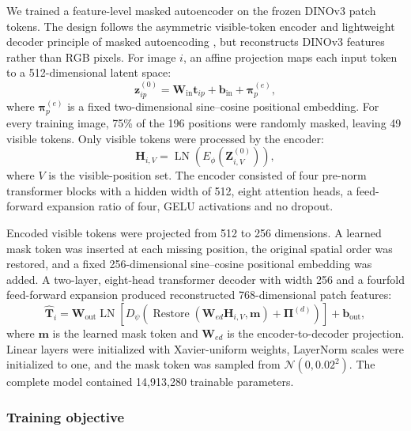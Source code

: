 We trained a feature-level masked autoencoder on the frozen DINOv3 patch tokens.
The design follows the asymmetric visible-token encoder and lightweight decoder
principle of masked autoencoding \cite{he2022maskedautoencoders}, but reconstructs
DINOv3 features rather than RGB pixels. For image $i$, an affine projection maps
each input token to a 512-dimensional latent space:
\begin{equation}
  \mathbf{z}^{(0)}_{ip}
  = \mathbf{W}_{\mathrm{in}}\mathbf{t}_{ip}
    + \mathbf{b}_{\mathrm{in}} + \boldsymbol{\pi}^{(e)}_p,
  \label{eq:mae_projection}
\end{equation}
where $\boldsymbol{\pi}^{(e)}_p$ is a fixed two-dimensional sine--cosine
positional embedding. For every training image, 75\% of the 196 positions were
randomly masked, leaving 49 visible tokens. Only visible tokens were processed
by the encoder:
\begin{equation}
  \mathbf{H}_{i,V}
  = \operatorname{LN}\!\left(
      E_{\phi}(\mathbf{Z}^{(0)}_{i,V})
    \right),
  \label{eq:mae_encoder}
\end{equation}
where $V$ is the visible-position set. The encoder consisted of four pre-norm
transformer blocks with a hidden width of 512, eight attention heads, a
feed-forward expansion ratio of four, GELU activations and no dropout.

Encoded visible tokens were projected from 512 to 256 dimensions. A learned
mask token was inserted at each missing position, the original spatial order was
restored, and a fixed 256-dimensional sine--cosine positional embedding was
added. A two-layer, eight-head transformer decoder with width 256 and a
fourfold feed-forward expansion produced reconstructed 768-dimensional patch
features:
\begin{equation}
  \widehat{\mathbf{T}}_i
  = \mathbf{W}_{\mathrm{out}}
    \operatorname{LN}\!\left[
      D_{\psi}\!\left(
        \operatorname{Restore}(
          \mathbf{W}_{ed}\mathbf{H}_{i,V},
          \mathbf{m})
        + \boldsymbol{\Pi}^{(d)}
      \right)
    \right]
    + \mathbf{b}_{\mathrm{out}},
  \label{eq:mae_decoder}
\end{equation}
where $\mathbf{m}$ is the learned mask token and
$\mathbf{W}_{ed}$ is the encoder-to-decoder projection. Linear layers were
initialized with Xavier-uniform weights, LayerNorm scales were initialized to
one, and the mask token was sampled from
$\mathcal{N}(0,0.02^2)$. The complete model contained 14,913,280 trainable
parameters.

\subsubsection{Training objective}

